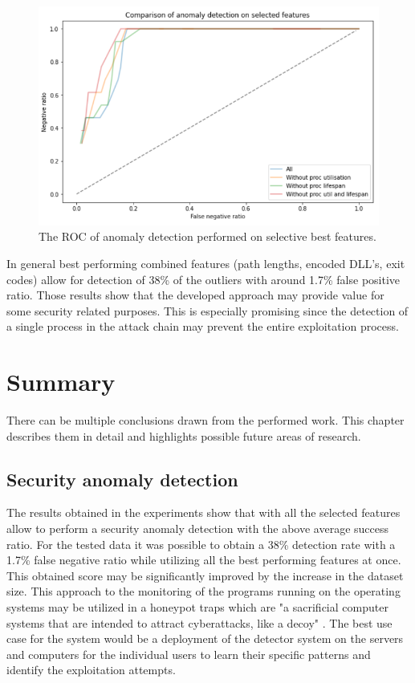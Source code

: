\documentclass[a4paper,twoside,12pt]{book}
\begin{document}
\begin{figure}
	\centering
	\includegraphics[scale=0.9]{images/CombinedFinalROCDroping2}
	\caption{The ROC of anomaly detection performed on selective best features.}
	\label{fig:combinedCompFinalROCDroping}
 \end{figure}

In general best performing combined features (path lengths, encoded DLL's, exit codes) allow for detection of 38\% of the 
outliers with around 1.7\% false positive ratio. Those results show that the developed approach may provide value for some 
security related purposes. This is especially promising since the detection of a single process in the attack chain may 
prevent the entire exploitation process.

\chapter{Summary}

There can be multiple conclusions drawn from the performed work. This chapter describes them in 
detail and highlights possible future areas of research.

\section{Security anomaly detection}

The results obtained in the experiments show that with all the selected features allow 
to perform a security anomaly detection with the above average success ratio. For the tested
data it was possible to obtain a 38\% detection rate with a 1.7\% false negative ratio while
utilizing all the best performing features at once. This obtained score may be significantly 
improved by the increase in the dataset size. This approach to the monitoring of the programs 
running on the operating systems may be utilized in a honeypot traps which are "a sacrificial 
computer systems that are intended to attract cyberattacks, like a decoy" \cite{bib:Honeypot}. 
The best use case for the system would be a deployment of the detector system on the servers and 
computers for the individual users to learn their specific patterns and identify the exploitation
attempts.
\end{document}
